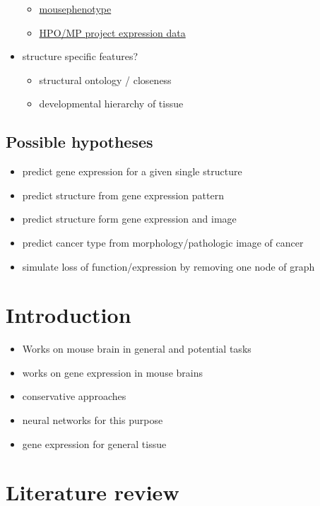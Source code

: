\documentclass[]{article}
\begin{document}
\begin{itemize}
\begin{itemize}
		\item \href{https://www.mousephenotype.org/}{mousephenotype}
		
		\item \href{http://www.informatics.jax.org/expression.shtml}{HPO/MP project expression data}
	\end{itemize}
	\item structure specific features?
	\begin{itemize}
		\item structural ontology / closeness
		\item developmental hierarchy of tissue
	\end{itemize}
\end{itemize}

\subsection*{Possible hypotheses}
\begin{itemize}
	\item predict gene expression for a given single structure
	\item predict structure from gene expression pattern
	\item predict structure form gene expression and image
	\item predict cancer type from morphology/pathologic image of cancer
	\item simulate loss of function/expression by removing one node of graph
\end{itemize}

\section{Introduction}

\begin{itemize}
	\item Works on mouse brain in general and potential tasks
	\item works on gene expression in mouse brains
	\item conservative approaches
	\item neural networks for this purpose
	\item gene expression for general tissue
	
\end{itemize}

\section{Literature review}
\end{document}
